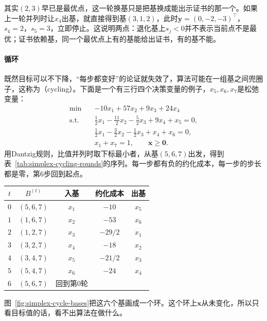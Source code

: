 其实$(2,3)$早已是最优点，这一轮换基只是把基换成能出示证书的那一个。如果上一轮并列时让$x_4$出基，就直接得到基$(3,1,2)$，此时$\bm{y}=(0,-2,-3)^\top$，$s_4=2$，$s_5=3$，立即停止。这说明两点：退化基上$s_j<0$并不表示当前点不是最优；证书依赖基，同一个最优点上有的基能给出证书，有的基不能。

\paragraph{循环}
既然目标可以不下降，“每步都变好”的论证就失效了，算法可能在一组基之间兜圈子，这称为（cycling）。下面是一个有三行四个决策变量的例子，$x_5,x_6,x_7$是松弛变量：
\begin{equation}
 \begin{aligned}
 \min\quad & -10x_1+57x_2+9x_3+24x_4\\
 \text{s.t.}\quad & \tfrac12x_1-\tfrac{11}{2}x_2-\tfrac52x_3+9x_4+x_5=0,\\
 & \tfrac12x_1-\tfrac32x_2-\tfrac12x_3+x_4+x_6=0,\\
 & x_1+x_7=1,\qquad \bm{x}\geq\bm{0}.
 \end{aligned}
 \label{eq:simplex-cycling-example}
\end{equation}
用Dantzig规则，比值并列时取下标最小者，从基$(5,6,7)$出发，得到表~\ref{tab:simplex-cycling-rounds}的序列。每一步都有负的约化成本，每一步的步长都是零，第$6$步回到起点。

\begin{BookInlineTable}
 \centering
 \begin{tabular}{ccccc}
  \toprule
  $t$ & $B^{(t)}$ & 入基 & 约化成本 & 出基\\
  \midrule
  $0$ & $(5,6,7)$ & $x_1$ & $-10$ & $x_5$\\
  $1$ & $(1,6,7)$ & $x_2$ & $-53$ & $x_6$\\
  $2$ & $(1,2,7)$ & $x_3$ & $-29/2$ & $x_1$\\
  $3$ & $(3,2,7)$ & $x_4$ & $-18$ & $x_2$\\
  $4$ & $(3,4,7)$ & $x_5$ & $-21/2$ & $x_3$\\
  $5$ & $(5,4,7)$ & $x_6$ & $-24$ & $x_4$\\
  $6$ & $(5,6,7)$ & 回到第$0$轮 & & \\
  \bottomrule
 \end{tabular}
 \caption{问题~\eqref{eq:simplex-cycling-example}在Dantzig规则下的循环。}
 \label{tab:simplex-cycling-rounds}
\end{BookInlineTable}

图~\ref{fig:simplex-cycle-bases}把这六个基画成一个环。这个环上$\bm{x}$从未变化，所以只看目标值的话，看不出算法在做什么。

